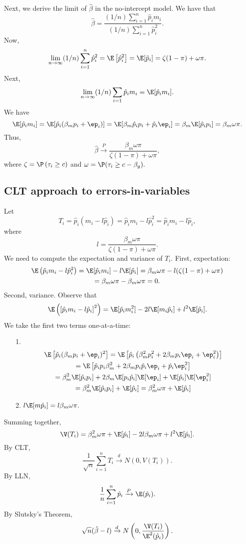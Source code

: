 \documentclass[12pt]{article}
\begin{document}
Next, we derive the limit of $\hat{\beta}$ in the no-intercept model. We have that 
$$\hat{\beta} = \frac{ (1/n) \sum_{i=1}^n \hat{p}_i m_i}{(1/n) \sum_{i=1}^n \hat{p}_i^2}.$$
Now,
$$\lim_{n \to \infty} (1/n) \sum_{i=1}^n \hat{p}_i^2 = \E\left[\hat{p}_i^2\right] = \E [\hat{p}_i] = \zeta (1 - \pi) + \omega \pi.$$
Next,
$$\lim_{n \to \infty} (1/n) \sum_{i=1} \hat{p}_i m_i = \E[\hat{p}_i m_i].$$ We have
$$ \E[\hat{p}_i m_i] = \E[ \hat{p}_i (\beta_m p_i + \ep_i)] = \E[\beta_m \hat{p}_i p_i + \hat{p}_i \ep_i] = \beta_m \E[ \hat{p}_i p_i] = \beta_m \omega \pi.$$ Thus,
$$ \hat{\beta} \xrightarrow{P} \frac{\beta_m \omega \pi}{ \zeta(1-\pi) + \omega \pi},$$ where $\zeta = \P\left(\tau_i \geq c \right)$ and $\omega = \P(\tau_i \geq c - \beta_g).$

\subsection{CLT approach to errors-in-variables}
Let 
$$ T_i = \hat{p}_i (m_i - l \hat{p}_i) = \hat{p}_im_i - l \hat{p}^2_i = \hat{p}_i m_i - l \hat{p}_i,$$ where
$$l = \frac{\beta_m \omega \pi}{\zeta (1 - \pi) + \omega \pi}. $$
We need to compute the expectation and variance of $T_i$. First, expectation:
\begin{multline*}
\E\left( \hat{p}_i m_i - l \hat{p}_i^2 \right) = \E [ \hat{p}_i m_i ] - l \E [\hat{p}_i] = \beta_m \omega \pi - l ( \zeta (1 - \pi) + \omega \pi ) \\ = \beta_m \omega \pi - \beta_m \omega \pi = 0.
\end{multline*}
Second, variance. Observe that
$$ \E \left( \left[ \hat{p}_i m_i - l \hat{p}_i \right]^2 \right) = \E [\hat{p}_i m_i^2] - 2 l \E[m_i \hat{p}_i] + l^2 \E[\hat{p}_i].$$ We take the first two terms one-at-a-time:
\begin{itemize}
\item[1.] \begin{multline*}
\E \left[ \hat{p}_i( \beta_m p_i + \ep_i )^2 \right] = \E\left[ \hat{p}_i \left( \beta_m^2 p_i^2 + 2 \beta_m p_i \ep_i + \ep_i^2 \right)  \right] \\ = \E\left[ \hat{p}_i p_i \beta^2_m + 2 \beta_m p_i \hat{p}_i \ep_i + \hat{p}_i \ep_i^2 \right] \\ = \beta^2_m \E[ \hat{p}_i p_i] + 2 \beta_m \E[p_i\hat{p}_i] \E[\ep_i] + \E[\hat{p}_i] \E[ \ep^2_i ] \\ = \beta^2_m \E[ \hat{p}_i p_i] + \E[\hat{p}_i] = \beta^2_m \omega \pi + \E[ \hat{p}_i ] 
\end{multline*}
\item[2.] $l \E[m \hat{p}_i] = l \beta_m \omega \pi.$
\end{itemize}
Summing together,
$$\V(T_i) = \beta^2_m\omega\pi + \E[\hat{p}_i] - 2 l \beta_m \omega \pi + l^2 \E[\hat{p}_i].$$
By CLT,
$$\frac{1}{\sqrt{n}} \sum_{i=1}^n T_i \xrightarrow{d} N(0, V(T_i)).$$
 By LLN, $$ \frac{1}{n} \sum_{i=1}^n \hat{p}_i \xrightarrow{P} \E(\hat{p}_i).$$
 By Slutsky's Theorem,
 $$\sqrt{n} (\hat{\beta} - l) \xrightarrow{d} N\left(0, \frac{\V(T_i)}{\E^2(\hat{p}_i)}\right).$$
\end{document}
